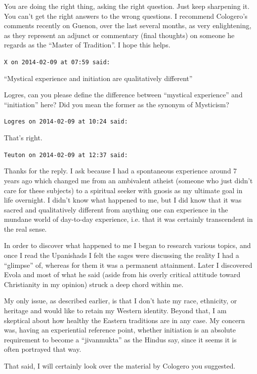 \begin{footnotesize}
\begin{sffamily}
You are doing the right thing, asking the right question. Just keep sharpening it. You can't get the right answers to the wrong questions. I recommend Cologero's comments recently on Guenon, over the last several months, as very enlightening, as they represent an adjunct or commentary (final thoughts) on someone he regards as the ``Master of Tradition''. I hope this helps.

\hfill

\texttt{X on 2014-02-09 at 07:59 said:}

``Mystical experience and initiation are qualitatively different''

Logres, can you please define the difference between ``mystical experience'' and ``initiation'' here? Did you mean the former as the synonym of Mysticism?

\hfill

\texttt{Logres on 2014-02-09 at 10:24 said:}

That's right.

\hfill

\texttt{Teuton on 2014-02-09 at 12:37 said:}

Thanks for the reply. I ask because I had a spontaneous experience around 7 years ago which changed me from an ambivalent atheist (someone who just didn't care for these subjects) to a spiritual seeker with gnosis as my ultimate goal in life overnight. I didn't know what happened to me, but I did know that it was sacred and qualitatively different from anything one can experience in the mundane world of day-to-day experience, i.e. that it was certainly transcendent in the real sense.

In order to discover what happened to me I began to research various topics, and once I read the Upanishads I felt the sages were discussing the reality I had a ``glimpse'' of, whereas for them it was a permanent attainment. Later I discovered Evola and most of what he said (aside from his overly critical attitude toward Christianity in my opinion) struck a deep chord within me.

My only issue, as described earlier, is that I don't hate my race, ethnicity, or heritage and would like to retain my Western identity. Beyond that, I am skeptical about how healthy the Eastern traditions are in any case. My concern was, having an experiential reference point, whether initiation is an absolute requirement to become a ``jivanmukta'' as the Hindus say, since it seems it is often portrayed that way.

That said, I will certainly look over the material by Cologero you suggested.


\end{sffamily}
\end{footnotesize}
